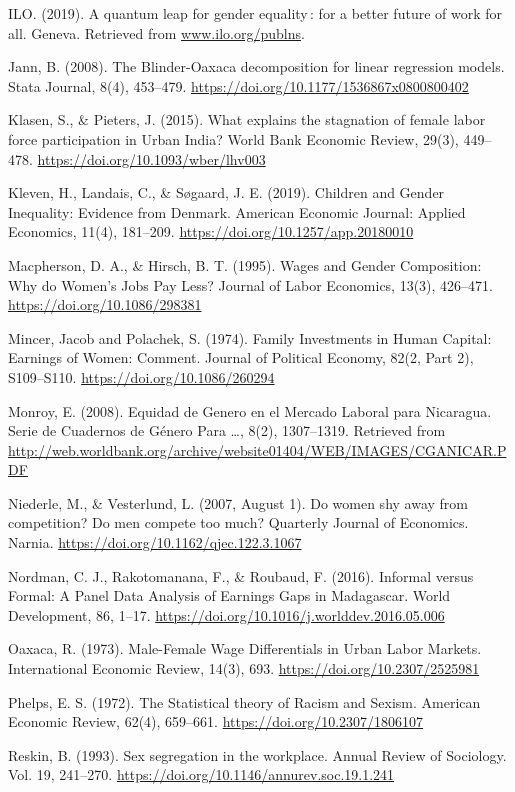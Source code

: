 ILO. (2019). A quantum leap for gender equality : for a better future of work for all. Geneva. Retrieved from \url{www.ilo.org/publns}.

Jann, B. (2008). The Blinder-Oaxaca decomposition for linear regression models. Stata Journal, 8(4), 453–479. \url{https://doi.org/10.1177/1536867x0800800402}

Klasen, S., \& Pieters, J. (2015). What explains the stagnation of female labor force participation in Urban India? World Bank Economic Review, 29(3), 449–478. \url{https://doi.org/10.1093/wber/lhv003}

Kleven, H., Landais, C., \& Søgaard, J. E. (2019). Children and Gender Inequality: Evidence from Denmark. American Economic Journal: Applied Economics, 11(4), 181–209. \url{https://doi.org/10.1257/app.20180010}

Macpherson, D. A., \& Hirsch, B. T. (1995). Wages and Gender Composition: Why do Women's Jobs Pay Less? Journal of Labor Economics, 13(3), 426–471. \url{https://doi.org/10.1086/298381}

Mincer, Jacob and Polachek, S. (1974). Family Investments in Human Capital: Earnings of Women: Comment. Journal of Political Economy, 82(2, Part 2), S109–S110. \url{https://doi.org/10.1086/260294}

Monroy, E. (2008). Equidad de Genero en el Mercado Laboral para Nicaragua. Serie de Cuadernos de Género Para …, 8(2), 1307–1319. Retrieved from \url{http://web.worldbank.org/archive/website01404/WEB/IMAGES/CGANICAR.PDF}

Niederle, M., \& Vesterlund, L. (2007, August 1). Do women shy away from competition? Do men compete too much? Quarterly Journal of Economics. Narnia. \url{https://doi.org/10.1162/qjec.122.3.1067}

Nordman, C. J., Rakotomanana, F., \& Roubaud, F. (2016). Informal versus Formal: A Panel Data Analysis of Earnings Gaps in Madagascar. World Development, 86, 1–17. \url{https://doi.org/10.1016/j.worlddev.2016.05.006}

Oaxaca, R. (1973). Male-Female Wage Differentials in Urban Labor Markets. International Economic Review, 14(3), 693. \url{https://doi.org/10.2307/2525981}

Phelps, E. S. (1972). The Statistical theory of Racism and Sexism. American Economic Review, 62(4), 659–661. \url{https://doi.org/10.2307/1806107}

Reskin, B. (1993). Sex segregation in the workplace. Annual Review of Sociology. Vol. 19, 241–270. \url{https://doi.org/10.1146/annurev.soc.19.1.241}

